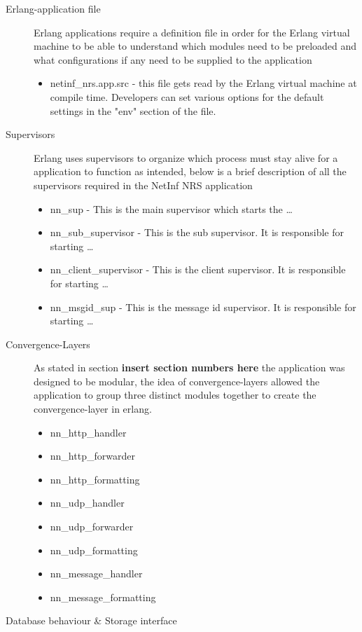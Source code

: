 \begin{description}
\item[Erlang-application file]
Erlang applications require a definition file in order for the Erlang virtual machine to be able to understand which modules need to be preloaded and what configurations if any need to be supplied to the application
\begin{itemize}
\item netinf\_nrs.app.src - this file gets read by the Erlang virtual machine at compile time. Developers can set various options for the default settings in the "env" section of the file.
\end{itemize}
\item[Supervisors]
Erlang uses supervisors to organize which process must stay alive for a application to function as intended, below is a brief description of all the supervisors required in the NetInf NRS application
\begin{itemize}
\item nn\_sup - This is the main supervisor which starts the \ldots
\item nn\_sub\_supervisor - This is the sub supervisor. It is responsible for starting \ldots
\item nn\_client\_supervisor - This is the client supervisor. It is responsible for starting \ldots
\item nn\_msgid\_sup - This is the message id supervisor. It is responsible for starting \ldots
\end{itemize}
\item[Convergence-Layers]
As stated in section \textbf{insert section numbers here} the application was designed to be modular, the idea of convergence-layers allowed the application to group three distinct modules together to create the convergence-layer in erlang.
\begin{itemize}
\item nn\_http\_handler 
\item nn\_http\_forwarder
\item nn\_http\_formatting
\item nn\_udp\_handler
\item nn\_udp\_forwarder
\item nn\_udp\_formatting
\item nn\_message\_handler
\item nn\_message\_formatting
\end{itemize}
\item[Database behaviour \& Storage interface]

\end{description}
